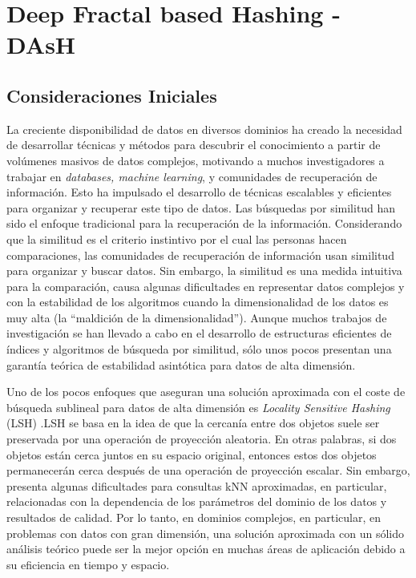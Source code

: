 \chapter{Deep Fractal based Hashing - DAsH}
 
 

\section{Consideraciones Iniciales}

La creciente disponibilidad de datos en diversos dominios ha creado la necesidad de desarrollar técnicas y métodos para descubrir el conocimiento a partir de volúmenes masivos de datos complejos, motivando a muchos investigadores a trabajar en \textit{databases, machine learning}, y comunidades de recuperación de información. Esto ha impulsado el desarrollo de técnicas escalables y eficientes para organizar y recuperar este tipo de datos. Las búsquedas por similitud han sido el enfoque tradicional para la recuperación de la información. Considerando que la similitud es el criterio instintivo por el cual las personas hacen comparaciones, las comunidades de recuperación de información usan similitud para organizar y buscar datos.    Sin embargo, la similitud es una medida intuitiva para la comparación, causa algunas dificultades en representar datos complejos y con la estabilidad de los algoritmos cuando la dimensionalidad de los datos es muy alta (la ``maldición de la dimensionalidad''). Aunque muchos trabajos de investigación se han llevado a cabo en el desarrollo de estructuras eficientes de índices y algoritmos de búsqueda por similitud, sólo unos pocos presentan una garantía teórica de estabilidad asintótica para datos de alta dimensión.

Uno de los pocos enfoques que aseguran una solución aproximada con el coste de búsqueda sublineal para datos de alta dimensión es \textit{Locality Sensitive Hashing} (LSH) \cite{lsh}.LSH se basa en la idea de que la cercanía entre dos objetos suele ser preservada por una operación de proyección aleatoria. En otras palabras, si dos objetos están cerca juntos en su espacio original, entonces estos dos objetos permanecerán cerca después de una operación de proyección escalar. Sin embargo, presenta algunas dificultades para consultas kNN aproximadas, en particular, relacionadas con la dependencia de los parámetros del dominio de los datos y resultados de calidad. Por lo tanto, en dominios complejos, en particular, en problemas con datos con gran dimensión, una solución aproximada con un sólido análisis teórico puede ser la mejor opción en muchas áreas de aplicación debido a su eficiencia en tiempo y espacio.

